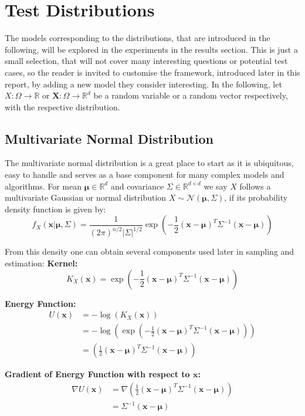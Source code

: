 
\section{Test Distributions}

The models corresponding to the distributions, that are introduced in the following, will be explored in the experiments in the results section.
This is just a small selection, that will not cover many interesting questions or potential test cases, 
so the reader is invited to customise the framework, introduced later in this report, by adding a new model they consider interesting.
In the following, let $X: \Omega \to \mathbb{R}$ or $\bm{X}: \Omega \to \mathbb{R}^d$ be a random variable or a random vector respectively,
with the respective distribution.


\subsection{Multivariate Normal Distribution}

The multivariate normal distribution is a great place to start as it is ubiquitous, easy to handle and serves as a base component for many complex models and algorithms.
For mean $\bm{\mu} \in \mathbb{R}^d$ and covariance $\Sigma \in \mathbb{R}^{d \times d}$ we say $X$ follows a multivariate Gaussian 
or normal distribution $X \sim \mathcal{N}(\bm{\mu}, \Sigma)$, if its probability density function is given by:
\[
	f_X(\bm{x} | \bm{\mu}, \Sigma) = \frac{1}{(2\pi)^{n/2}|\Sigma|^{1/2}} \exp\left(-\frac{1}{2} (\bm{x} - \bm{\mu})^T \Sigma^{-1} (\bm{x} - \bm{\mu})\right)
\]

From this density one can obtain several components used later in sampling and estimation:
\textbf{Kernel:}
\[
	K_X (\bm{x}) = \exp \left( -\frac{1}{2} (\bm{x} - \bm{\mu})^T \Sigma^{-1} (\bm{x} - \bm{\mu}) \right)
\]

\textbf{Energy Function:}
\[
\begin{aligned}
	U(\bm{x}) &= - \log( K_X (\bm{x}) ) \\
	&= - \log( \exp \left( -\frac{1}{2} (\bm{x} - \bm{\mu})^T \Sigma^{-1} (\bm{x} - \bm{\mu}) \right) ) \\
	&= \left( \frac{1}{2} (\bm{x} - \bm{\mu})^T \Sigma^{-1} (\bm{x} - \bm{\mu}) \right)
\end{aligned}
\]

\textbf{Gradient of Energy Function with respect to $\bm{x}$:}
\[
\begin{aligned}
	\nabla U(\bm{x}) &= \nabla \left( \frac{1}{2} (\bm{x} - \bm{\mu})^T \Sigma^{-1} (\bm{x} - \bm{\mu}) \right) \\
	&= \Sigma^{-1} (\bm{x} - \bm{\mu}) \\
\end{aligned}
\]

